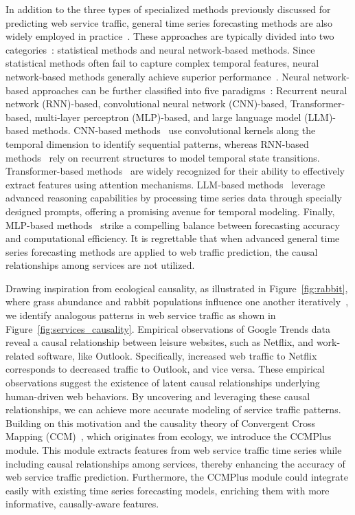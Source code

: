 In addition to the three types of specialized methods previously discussed for predicting web service traffic, general time series forecasting methods are also widely employed in practice~\cite{zou2024optscaler, alharthi2024auto}. These approaches are typically divided into two categories~\cite{qiu2024tfb}: statistical methods and neural network-based methods. Since statistical methods often fail to capture complex temporal features, neural network-based methods generally achieve superior performance~\cite{wutimesnet}. Neural network-based approaches can be further classified into five paradigms~\cite{wangtimemixer, tan2024language}: Recurrent neural network (RNN)-based, convolutional neural network (CNN)-based, Transformer-based, multi-layer perceptron (MLP)-based, and large language model (LLM)-based methods. CNN-based methods~\cite{wang2023micn, hewage2020temporal} use convolutional kernels along the temporal dimension to identify sequential patterns, whereas RNN-based methods~\cite{franceschi2019unsupervised, dudukcu2023temporal, peng2024reservoir} rely on recurrent structures to model temporal state transitions. Transformer-based methods~\cite{zhou2022fedformer, liuitransformer, chenpathformer, wang2024timexer} are widely recognized for their ability to effectively extract features using attention mechanisms. 
LLM-based methods~\cite{tan2024language, touvron2023llama, jintime} leverage advanced reasoning capabilities by processing time series data through specially designed prompts, offering a promising avenue for temporal modeling. 
Finally, MLP-based methods~\cite{wang2024timexer, olivares2023neural, daslong, wutimesnet} strike a compelling balance between forecasting accuracy and computational efficiency. It is regrettable that when advanced general time series forecasting methods are applied to web traffic prediction, the causal relationships among services are not utilized.

Drawing inspiration from ecological causality, as illustrated in Figure~\ref{fig:rabbit}, where grass abundance and rabbit populations influence one another iteratively~\cite{ji2022superprocesses}, we identify analogous patterns in web service traffic as shown in Figure~\ref{fig:services_causality}. Empirical observations of Google Trends data reveal a causal relationship between leisure websites, such as Netflix, and work-related software, like Outlook. Specifically, increased web traffic to Netflix corresponds to decreased traffic to Outlook, and vice versa. 
These empirical observations suggest the existence of latent causal relationships underlying human-driven web behaviors. By uncovering and leveraging these causal relationships, we can achieve more accurate modeling of service traffic patterns.
Building on this motivation and the causality theory of Convergent Cross Mapping (CCM)~\cite{sugihara2012detecting}, which originates from ecology, we introduce the CCMPlus module. This module extracts features from web service traffic time series while including causal relationships among services, thereby enhancing the accuracy of web service traffic prediction. Furthermore, the CCMPlus module could integrate easily with existing time series forecasting models, enriching them with more informative, causally-aware features.

